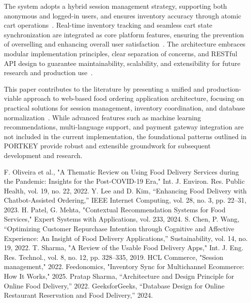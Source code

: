 The system adopts a hybrid session management strategy, supporting both anonymous and logged-in users, and ensures inventory accuracy through atomic cart operations~\cite{b4}. Real-time inventory tracking and seamless cart state synchronization are integrated as core platform features, ensuring the prevention of overselling and enhancing overall user satisfaction~\cite{b2}. The architecture embraces modular implementation principles, clear separation of concerns, and RESTful API design to guarantee maintainability, scalability, and extensibility for future research and production use~\cite{b5,b14}.

This paper contributes to the literature by presenting a unified and production-viable approach to web-based food ordering application architecture, focusing on practical solutions for session management, inventory coordination, and database normalization~\cite{b15}. While advanced features such as machine learning recommendations, multi-language support, and payment gateway integration are not included in the current implementation, the foundational patterns outlined in PORTKEY provide robust and extensible groundwork for subsequent development and research.

 F. Oliveira et al., "A Thematic Review on Using Food Delivery Services during the Pandemic: Insights for the Post-COVID-19 Era," Int. J. Environ. Res. Public Health, vol. 19, no. 22, 2022.
 Y. Lee and D. Kim, “Enhancing Food Delivery with Chatbot-Assisted Ordering,” IEEE Internet Computing, vol. 28, no. 3, pp. 22–31, 2023.
 H. Patel, G. Mehta, "Contextual Recommendation Systems for Food Services," Expert Systems with Applications, vol. 233, 2024.
 S. Chen, P. Wang, “Optimizing Customer Repurchase Intention through Cognitive and Affective Experience: An Insight of Food Delivery Applications,” Sustainability, vol. 14, no. 19, 2022.
 T. Sharma, "A Review of the Usable Food Delivery Apps," Int. J. Eng. Res. Technol., vol. 8, no. 12, pp. 328–335, 2019.
 HCL Commerce, "Session management," 2022.
 Feedonomics, "Inventory Sync for Multichannel Ecommerce: How It Works," 2025.
 Pratap Sharma, “Architecture and Design Principle for Online Food Delivery,” 2022.
 GeeksforGeeks, “Database Design for Online Restaurant Reservation and Food Delivery,” 2024.
